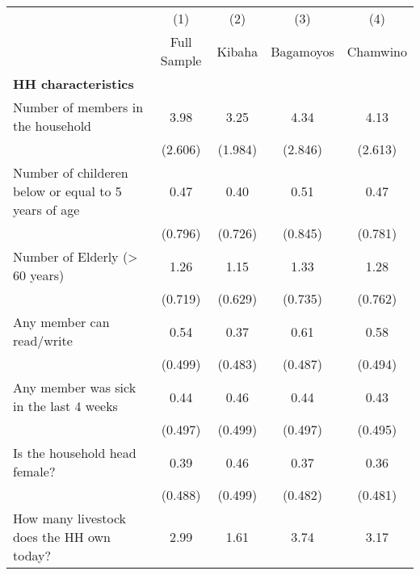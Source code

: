 {
\def\sym#1{\ifmmode^{#1}\else\(^{#1}\)\fi}
\begin{tabular}{l*{4}{c}}
\hline\hline
                    &\multicolumn{1}{c}{(1)}&\multicolumn{1}{c}{(2)}&\multicolumn{1}{c}{(3)}&\multicolumn{1}{c}{(4)}\\
                    &\multicolumn{1}{c}{Full Sample}&\multicolumn{1}{c}{ Kibaha}&\multicolumn{1}{c}{Bagamoyos}&\multicolumn{1}{c}{Chamwino}\\
\hline
\textbf{HH characteristics}&                     &                     &                     &                     \\
[1em]
Number of members in the household&        3.98         &        3.25         &        4.34         &        4.13         \\
                    &     (2.606)         &     (1.984)         &     (2.846)         &     (2.613)         \\
[1em]
Number of childeren below or equal to 5 years of age&        0.47         &        0.40         &        0.51         &        0.47         \\
                    &     (0.796)         &     (0.726)         &     (0.845)         &     (0.781)         \\
[1em]
Number of Elderly (> 60 years)&        1.26         &        1.15         &        1.33         &        1.28         \\
                    &     (0.719)         &     (0.629)         &     (0.735)         &     (0.762)         \\
[1em]
Any member can read/write&        0.54         &        0.37         &        0.61         &        0.58         \\
                    &     (0.499)         &     (0.483)         &     (0.487)         &     (0.494)         \\
[1em]
Any member was sick in the last 4 weeks&        0.44         &        0.46         &        0.44         &        0.43         \\
                    &     (0.497)         &     (0.499)         &     (0.497)         &     (0.495)         \\
[1em]
Is the household head female?&        0.39         &        0.46         &        0.37         &        0.36         \\
                    &     (0.488)         &     (0.499)         &     (0.482)         &     (0.481)         \\
[1em]
How many livestock does the HH own today?&        2.99         &        1.61         &        3.74         &        3.17         \\

\end{tabular}}
